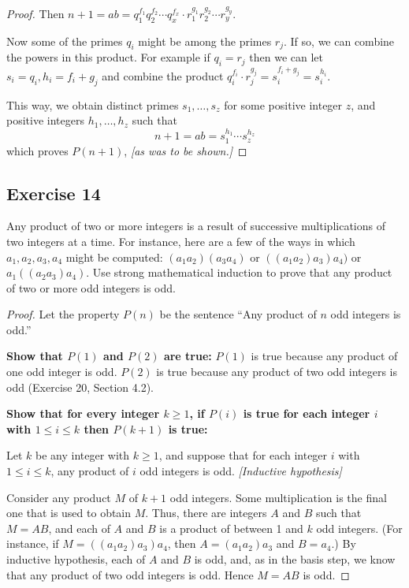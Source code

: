 \documentclass[14pt]{extarticle}
\begin{document}
\begin{proof}
    Then $n+1 = ab = q_1^{f_1} q_2^{f_2} \cdots q_x^{f_x} \cdot r_1^{g_1} r_2^{g_2} \cdots r_y^{g_y}$.

    Now some of the primes $q_i$ might be among the primes $r_j$. If so, we can combine the powers in this product. For example if $q_i = r_j$ then we can let $s_i = q_i, h_i = f_i + g_j$ and combine the product $q_i^{f_i} \cdot r_j^{g_j} = s_i^{f_i + g_j} = s_i^{h_i}$.

    This way, we obtain distinct primes $s_1, \ldots, s_z$ for some positive integer $z$, and positive integers $h_1, \ldots, h_z$ such that
    \[
        n+1 = ab = s_1^{h_1} \cdots s_z^{h_z}
    \]
    which proves $P(n+1)$, {\it [as was to be shown.]}
\end{proof}

\subsection{Exercise 14}
Any product of two or more integers is a result of successive multiplications of two integers at a time. For instance, here are a few of the ways in which $a_1, a_2, a_3, a_4$ might be computed: $(a_1 a_2)(a_3 a_4)$ or $((a_1 a_2) a_3) a_4)$ or $a_1((a_2 a_3) a_4)$. Use strong mathematical induction to prove that any product of two or more odd integers is odd.

\begin{proof}
    Let the property $P(n)$ be the sentence “Any product of $n$ odd integers is odd.”

    {\bf Show that $P(1)$ and $P(2)$ are true:}
    $P(1)$ is true because any product of one odd integer is odd.
    $P(2)$ is true because any product of two odd integers is odd (Exercise 20, Section 4.2).

        {\bf Show that for every integer $k \geq 1$, if $P(i)$ is true for each integer $i$ with $1 \leq i \leq k$ then $P(k + 1)$ is true:}

    Let $k$ be any integer with $k \geq 1$, and suppose that
    for each integer $i$ with $1 \leq i \leq k$, any product
    of $i$ odd integers is odd. {\it [Inductive hypothesis]}

    Consider any product $M$ of $k + 1$ odd integers.
    Some multiplication is the final one that is used to obtain $M$.
    Thus, there are integers $A$ and $B$ such that $M = AB$,
    and each of $A$ and $B$ is a product of between 1 and $k$
    odd integers.
    (For instance, if $M = ((a_1a_2)a_3)a_4$, then $A = (a_1a_2)a_3$ and $B = a_4$.)
    By inductive hypothesis, each of $A$ and $B$ is odd, and,
    as in the basis step, we know that any product of two odd
    integers is odd. Hence $M = AB$ is odd.
\end{proof}
\end{document}
